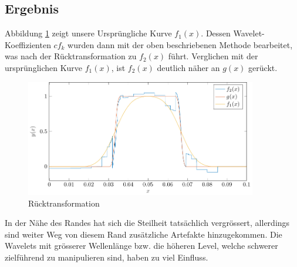 \subsection{Ergebnis}
Abbildung \ref{deconvolve:result_1d} zeigt unsere Ursprüngliche Kurve $f_1(x)$.
Dessen Wavelet-Koeffizienten $cf_k$ wurden dann mit der oben beschriebenen Methode bearbeitet, was nach der Rücktransformation zu $f_2(x)$ führt.
Verglichen mit der ursprünglichen Kurve $f_1(x)$, ist $f_2(x)$ deutlich näher an $g(x)$ gerückt.
\begin{figure}[h]
\centering
\includegraphics[width=0.9\textwidth]{./papers/deconvolve/pictures/result_1d.pdf}
\caption{Rücktransformation\label{deconvolve:result_1d}}
\end{figure}

In der Nähe des Randes hat sich die Steilheit tatsächlich vergrössert, allerdings sind weiter Weg von diesem Rand zusätzliche Artefakte hinzugekommen.
Die Wavelets mit grösserer \glqq Wellenlänge \grqq{} bzw. die höheren Level, welche schwerer zielführend zu manipulieren sind, haben zu viel Einfluss.
